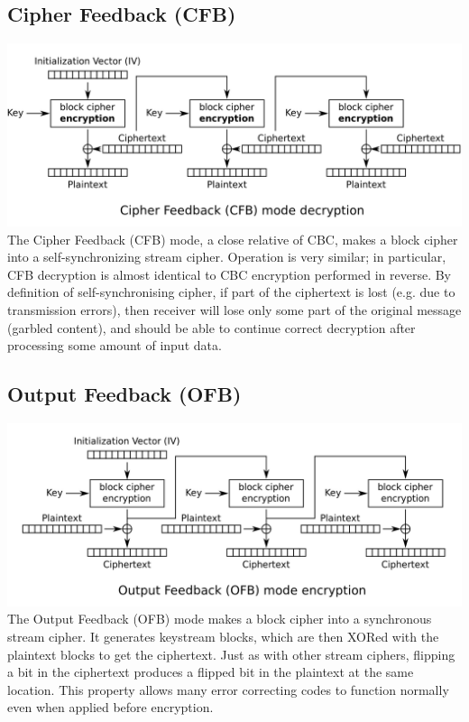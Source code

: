 \documentclass[10pt,a4paper]{article}
\begin{document}
\subsection{Cipher Feedback (CFB)}
\includegraphics[scale=0.2]{img/CFB.png}
\newline 
The Cipher Feedback (CFB) mode, a close relative of CBC, makes a block cipher into a self-synchronizing stream cipher. Operation is very similar; in particular, CFB decryption is almost identical to CBC encryption performed in reverse.
By definition of self-synchronising cipher, if part of the ciphertext is lost (e.g. due to transmission errors), then receiver will lose only some part of the original message (garbled content), and should be able to continue correct decryption after processing some amount of input data.
\subsection{Output Feedback (OFB)}
\includegraphics[scale=0.2]{img/OFB.png}
\newline 
The Output Feedback (OFB) mode makes a block cipher into a synchronous stream cipher. It generates keystream blocks, which are then XORed with the plaintext blocks to get the ciphertext. Just as with other stream ciphers, flipping a bit in the ciphertext produces a flipped bit in the plaintext at the same location. This property allows many error correcting codes to function normally even when applied before encryption.
\end{document}
